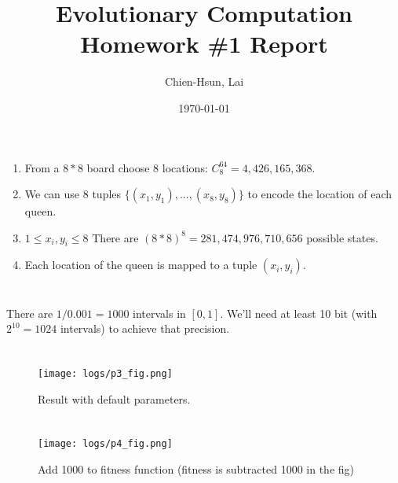 \documentclass[A4]{article}
\title{Evolutionary Computation Homework \#1 Report}
\author{Chien-Hsun, Lai}
\date{\today}
\begin{document}
\maketitle

\section{}
\label{sec:p1}

\begin{enumerate}[label=(\alph*)]
\item From a $ 8*8 $ board choose $ 8 $ locations: $ C^{64}_{8} = 4,426,165,368 $.
\item We can use 8 tuples $ \{(x_1, y_1), ... , (x_8, y_8)\} $ to encode the location of each queen.
\item $ 1 \leq x_i, y_i \leq 8 $ There are $ (8*8)^8 = 281,474,976,710,656 $ possible states.
\item Each location of the queen is mapped to a tuple $(x_i, y_i)$.
\end{enumerate}

\section{}
\label{sec:p2}

There are $ 1 / 0.001 = 1000 $ intervals in $ [0, 1] $.
We'll need at least 10 bit (with $ 2^{10} = 1024 $ intervals) to achieve that precision.

\section{}
\label{sec:p3}

\begin{figure}[H]
\centering
\texttt{[image: logs/p3\_fig.png]}
\caption{\label{fig:p3} Result with default parameters.}
\end{figure}

\section{}
\label{sec:p4}

\begin{figure}[H]
\centering
\texttt{[image: logs/p4\_fig.png]}
\caption{\label{fig:p4} Add 1000 to fitness function (fitness is subtracted 1000 in the fig)}
\end{figure}

\section{}
\label{sec:p5}
\end{document}
